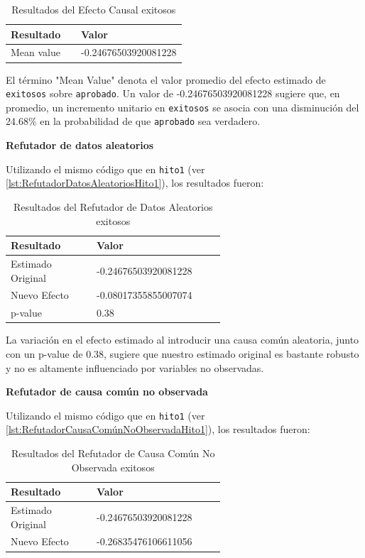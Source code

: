 \begin{table}[H]
    \centering        
    \begin{tabular}{lp{0.6\linewidth}}
        \toprule
        \textbf{Resultado} & \textbf{Valor} \\
        \midrule
        Mean value & -0.24676503920081228 \\
        \bottomrule
    \end{tabular}
    \caption{Resultados del Efecto Causal exitosos}
    \label{tab:efecto_causal_exitosos}
\end{table}

El término "Mean Value" denota el valor promedio del efecto estimado de \texttt{exitosos} sobre \texttt{aprobado}. Un valor de -0.24676503920081228 sugiere que, en promedio, un incremento unitario en \texttt{exitosos} se asocia con una disminución del 24.68\% en la probabilidad de que \texttt{aprobado} sea verdadero.

\textbf{Refutador de datos aleatorios}

Utilizando el mismo código que en \texttt{hito1} (ver \ref{lst:RefutadorDatosAleatoriosHito1}), los resultados fueron:

\begin{table}[H]
    \centering        
    \begin{tabular}{lp{0.6\linewidth}}
        \toprule
        \textbf{Resultado} & \textbf{Valor} \\
        \midrule
        Estimado Original & -0.24676503920081228 \\
        Nuevo Efecto & -0.08017355855007074 \\
        p-value & 0.38 \\
        \bottomrule
    \end{tabular}
    \caption{Resultados del Refutador de Datos Aleatorios exitosos}
    \label{tab:refutador_datos_aleatorios_exitosos}
\end{table}

La variación en el efecto estimado al introducir una causa común aleatoria, junto con un p-value de 0.38, sugiere que nuestro estimado original es bastante robusto y no es altamente influenciado por variables no observadas.

\textbf{Refutador de causa común no observada}

Utilizando el mismo código que en \texttt{hito1} (ver \ref{lst:RefutadorCausaComúnNoObservadaHito1}), los resultados fueron:

\begin{table}[H]
    \centering
    \begin{tabular}{lp{0.6\linewidth}}
        \toprule
        \textbf{Resultado} & \textbf{Valor} \\
        \midrule
        Estimado Original & -0.24676503920081228 \\
        Nuevo Efecto & -0.26835476106611056 \\
        \bottomrule
    \end{tabular}
    \caption{Resultados del Refutador de Causa Común No Observada exitosos}
    \label{tab:refutador_causa_no_observada_exitosos}
\end{table}

